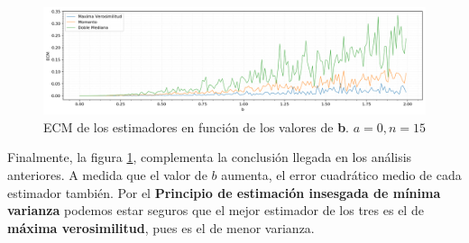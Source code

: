 \begin{figure}[H]
	\centering
	\includegraphics[width=1\textwidth]{imagenes/ecm.png}
	\caption{\footnotesize ECM de los estimadores en función de los valores de \textbf{b}. $a=0, n=15$}
	\label{fig:ej6-ecm}
\end{figure}

Finalmente, la figura \ref{fig:ej6-ecm}, complementa la conclusión llegada en los análisis anteriores. A medida que el valor de $b$ aumenta, el error cuadrático medio de cada estimador también. Por el \textbf{Principio de estimación insesgada de mínima varianza} podemos estar seguros que el mejor estimador de los tres es el de \textbf{máxima verosimilitud}, pues es el de menor varianza.